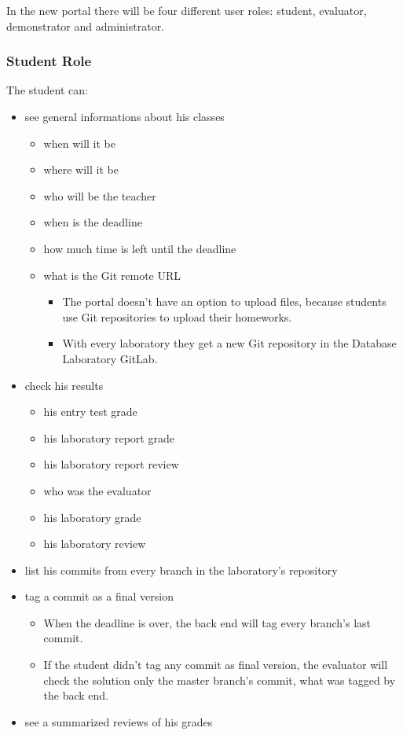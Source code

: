 In the new portal there will be four different user roles: student, evaluator, demonstrator and administrator. 

\subsubsection{Student Role}

The student can:

\begin{itemize}
	\item see general informations about his classes
	\begin{itemize}
		\item when will it be
		\item where will it be
		\item who will be the teacher
		\item when is the deadline
		\item how much time is left until the deadline
		\item what is the Git remote URL
		\begin{itemize}
			\item The portal doesn't have an option to upload files, because students use Git repositories to upload their homeworks.
			\item With every laboratory they get a new Git repository in the Database Laboratory GitLab.
		\end{itemize}
	\end{itemize}
	\item check his results
	\begin{itemize}
		\item his entry test grade
		\item his laboratory report grade
		\item his laboratory report review
		\item who was the evaluator
		\item his laboratory grade
		\item his laboratory review
	\end{itemize}
	\item list his commits from every branch in the laboratory's repository
	\item tag a commit as a final version
	\begin{itemize}
		\item When the deadline is over, the back end will tag every branch's last commit.
		\item If the student didn't tag any commit as final version, the evaluator will check the solution only the master branch's commit, what was tagged by the back end.
	\end{itemize}
	\item see a summarized reviews of his grades
\end{itemize}

